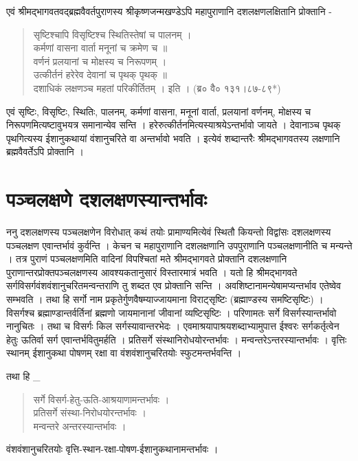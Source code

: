 एवं श्रीमद्भागवतवद्ब्रह्मवैवर्तपुराणस्य श्रीकृष्णजन्मखण्डेऽपि महापुराणानि दशलक्षणलक्षितानि प्रोक्तानि -
\begin{verse}
सृष्टिश्चापि विसृष्टिश्च स्थितिस्तेषां च पालनम् ।\\
कर्मणां वासना वार्ता मनूनां च क्रमेण च ॥\\
वर्णनं प्रलयानां च मोक्षस्य च निरूपणम् ।\\
उत्कीर्तनं हरेरेव देवानां च पृथक् पृथक् ॥\\
दशाधिकं लक्षणञ्च महतां परिकीर्तितम् । इति । (ब्र० वै० १३१।८७-८९*)
\end{verse}
एवं सृष्टिः, विसृष्टिः, स्थितिः, पालनम्, कर्मणां वासना, मनूनां वार्ता, प्रलयानां वर्णनम्, मोक्षस्य च निरूपणमित्यष्टावुभयत्र समानान्येव सन्ति । हरेरुत्कीर्तनमित्यस्याश्रयेऽन्तर्भावो जायते । देवानाञ्च पृथक् पृथगित्यस्य ईशानुकथायां वंशानुचरिते वा अन्तर्भावो भवति । इत्येवं शब्दान्तरैः श्रीमद्भागवतस्य लक्षणानि ब्रह्मवैवर्तेऽपि प्रोक्तानि ।

\section*{पञ्चलक्षणे दशलक्षणस्यान्तर्भावः}

ननु दशलक्षणस्य पञ्चलक्षणेन विरोधात् कथं तयोः प्रामाण्यमित्येवं स्थितौ कियन्तो विद्वांसः दशलक्षणस्य पञ्चलक्षण एवान्तर्भावं कुर्वन्ति । केचन च महापुराणानि दशलक्षणानि उपपुराणानि पञ्चलक्षणानीति च मन्यन्ते । तत्र पुराणं पञ्चलक्षणमिति वादिनां विपश्चितां मते श्रीमद्भागवते प्रोक्तानि दशलक्षणानि पुराणान्तरप्रोक्तपञ्चलक्षणस्य आवश्यकतानुसारं विस्तारमात्रं भवति । यतो हि श्रीमद्भागवते सर्गविसर्गवंशवंशानुचरितमन्वन्तराणि तु शब्दत एव प्रोक्तानि सन्ति । अवशिष्टानामन्येषामप्यन्तर्भाव एतेष्वेव सम्भवति । तथा हि सर्गो नाम प्रकृतेर्गुणवैषम्याज्जायमाना विराट्सृष्टिः (ब्रह्माण्डस्य समष्टिसृष्टिः) । विसर्गश्च ब्रह्माण्डान्तर्वर्तिनां ब्रह्मणो जायमानानां जीवानां व्यष्टिसृष्टिः । परिणामतः सर्गे विसर्गस्यान्तर्भावो नानुचितः । तथा च विसर्गः किल सर्गस्यावान्तरभेदः । एवमाश्रयापाश्रयशब्दाभ्यामुपात्त ईश्वरः सर्गकर्तृत्वेन हेतुः ऊतिर्वा सर्ग एवान्तर्भवितुमर्हति । प्रतिसर्गे संस्थानिरोधयोरन्तर्भावः । मन्वन्तरेऽन्तरस्यान्तर्भावः । वृत्तिः स्थानम् ईशानुकथा पोषणम् रक्षा वा वंशवंशानुचरितयोः स्फुटमन्तर्भवन्ति ।

तथा हि \_
\begin{verse}
सर्गे विसर्ग-हेतु-ऊति-आश्रयाणामन्तर्भावः ।\\
प्रतिसर्गे संस्था-निरोधयोरन्तर्भावः ।\\
मन्वन्तरे अन्तरस्यान्तर्भावः ।
\end{verse}
वंशवंशानुचरितयोः वृत्ति-स्थान-रक्षा-पोषण-ईशानुकथानामन्तर्भावः ।

